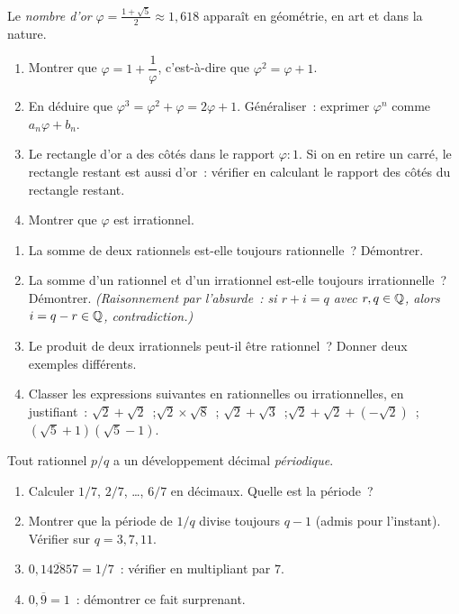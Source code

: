 \begin{challenge}
Le \emph{nombre d'or} $\varphi = \frac{1+\sqrt{5}}{2} \approx 1{,}618$ appara\^it
en g\'eom\'etrie, en art et dans la nature.
\begin{enumerate}
  \item Montrer que $\varphi = 1 + \dfrac{1}{\varphi}$,
        c'est-\`a-dire que $\varphi^2 = \varphi + 1$.
  \item En d\'eduire que $\varphi^3 = \varphi^2 + \varphi = 2\varphi + 1$.
        G\'en\'eraliser~: exprimer $\varphi^n$ comme $a_n\varphi + b_n$.
  \item Le rectangle d'or a des c\^ot\'es dans le rapport $\varphi:1$.
        Si on en retire un carr\'e, le rectangle restant est aussi d'or~:
        v\'erifier en calculant le rapport des c\^ot\'es du rectangle restant.
  \item Montrer que $\varphi$ est irrationnel.
\end{enumerate}
\end{challenge}

\begin{challenge}
\begin{enumerate}
  \item La somme de deux rationnels est-elle toujours rationnelle~?
        D\'emontrer.
  \item La somme d'un rationnel et d'un irrationnel est-elle toujours
        irrationnelle~? D\'emontrer.
        \emph{(Raisonnement par l'absurde~: si $r + i = q$ avec $r, q \in \mathbb{Q}$,
        alors $i = q - r \in \mathbb{Q}$, contradiction.)}
  \item Le produit de deux irrationnels peut-il \^etre rationnel~?
        Donner deux exemples diff\'erents.
  \item Classer les expressions suivantes en rationnelles ou irrationnelles,
        en justifiant~:
        $\sqrt{2}+\sqrt{2}$~;\quad $\sqrt{2}\times\sqrt{8}$~;\quad
        $\sqrt{2}+\sqrt{3}$~;\quad $\sqrt{2}+\sqrt{2}+(-\sqrt{2})$~;\quad
        $(\sqrt{5}+1)(\sqrt{5}-1)$.
\end{enumerate}
\end{challenge}

\begin{challenge}
Tout rationnel $p/q$ a un d\'eveloppement d\'ecimal \emph{p\'eriodique}.
\begin{enumerate}
  \item Calculer $1/7$, $2/7$, \ldots, $6/7$ en d\'ecimaux.
        Quelle est la p\'eriode~?
  \item Montrer que la p\'eriode de $1/q$ divise toujours $q-1$
        (admis pour l'instant).
        V\'erifier sur $q = 3, 7, 11$.
  \item $0{,}\overline{142857} = 1/7$~: v\'erifier en multipliant par $7$.
  \item $0{,}\overline{9} = 1$~: d\'emontrer ce fait surprenant.
\end{enumerate}
\end{challenge}

